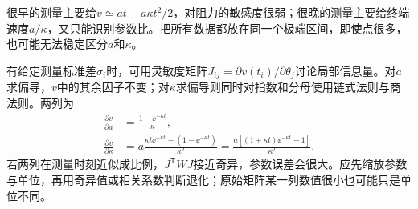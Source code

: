 很早的测量主要给$v\simeq at-a\kappa t^2/2$，对阻力的敏感度很弱；很晚的测量主要给终端速度$a/\kappa$，又只能识别参数比。把所有数据都放在同一个极端区间，即使点很多，也可能无法稳定区分$a$和$\kappa$。

有给定测量标准差$\sigma_i$时，可用灵敏度矩阵$J_{ij}=\partial v(t_i)/\partial\theta_j$讨论局部信息量。对$a$求偏导，$v$中的其余因子不变；对$\kappa$求偏导则同时对指数和分母使用链式法则与商法则。两列为
\[
\begin{aligned}
\frac{\partial v}{\partial a}&=\frac{1-\ee^{-\kappa t}}\kappa,\\
\frac{\partial v}{\partial\kappa}
&=a\frac{\kappa t\ee^{-\kappa t}-(1-\ee^{-\kappa t})}{\kappa^2}
=\frac{a[(1+\kappa t)\ee^{-\kappa t}-1]}{\kappa^2}.
\end{aligned}
\]
若两列在测量时刻近似成比例，$J^{\mathsf T}WJ$接近奇异，参数误差会很大。应先缩放参数与单位，再用奇异值或相关系数判断退化；原始矩阵某一列数值很小也可能只是单位不同。

